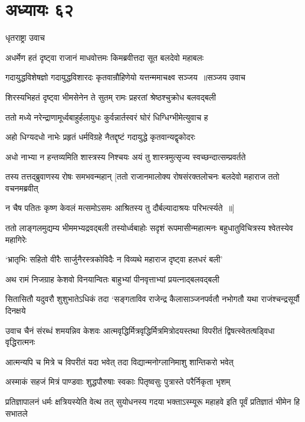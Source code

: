 \chapter{अध्यायः ६२}
\twolineshloka
{धृतराष्ट्रा उवाच}
{}


\twolineshloka
{अधर्मेण हतं दृष्ट्वा राजानं माधवोत्तमः}
{किमब्रवीत्तदा सूत बलदेवो महाबलः}


\threelineshloka
{गदायुद्धविशेषज्ञो गदायुद्धविशारदः}
{कृतवान्रौहिणेयो यत्तन्ममाचक्ष्व सञ्जय ॥सञ्जय उवाच}
{}


\twolineshloka
{शिरस्यभिहतं दृष्ट्वा भीमसेनेन ते सुतम्}
{रामः प्रहरतां श्रेष्ठश्चुक्रोध बलवद्बली}


\twolineshloka
{ततो मध्ये नरेन्द्राणामूर्ध्वबाहुर्हलायुधः}
{कुर्वन्नार्तस्वरं घोरं धिग्धिग्भीमेत्युवाच ह}


\twolineshloka
{अहो धिग्यदधो नाभेः प्रहृतं धर्मविग्रहे}
{नैतद्दृष्टं गदायुद्धे कृतवान्यद्वृकोदरः}


\twolineshloka
{अधो नाभ्या न हन्तव्यमिति शास्त्रस्य निश्चयः}
{अयं तु शास्त्रमुत्सृज्य स्वच्छन्दात्सम्प्रवर्तते}


\threelineshloka
{तस्य तत्तद्ब्रुवाणस्य रोषः समभवन्महान्}
{[ततो राजानमालोक्य रोषसंरक्तलोचनः}
{बलदेवो महाराज ततो वचनमब्रवीत्}


\twolineshloka
{न चैष पतितः कृष्ण केवलं मत्समोऽसमः}
{आश्रितस्य तु दौर्बल्यादाश्रयः परिभर्त्स्यते ॥]}


ततो लाङ्गलमुद्यम्य भीममभ्यद्रवद्बली
\twolineshloka
{तस्योर्ध्वबाहोः सदृशं रूपमासीन्महात्मनः}
{बहुधातुविचित्रस्य श्वेतस्येव महागिरेः}


\twolineshloka
{`भ्रातृभिः सहितो वीरैः सार्जुनैरस्त्रकोविदैः}
{न विव्यथे महाराज दृष्ट्वा हलधरं बली'}


\twolineshloka
{अथ रामं निजग्राह केशवो विनयान्वितः}
{बाहुभ्यां पीनवृत्ताभ्यां प्रयत्नाद्बलवद्बली}


\threelineshloka
{सितासितौ यदुवरौ शुशुभातेऽधिकं तदा}
{`सङ्गताविव राजेन्द्र कैलासाञ्जनपर्वतौ}
{नभोगतौ यथा राजंश्चन्द्रसूर्यौ दिनक्षये}


उवाच चैनं संरब्धं शमयन्निव केशवः
\twolineshloka
{आत्मवृद्धिर्मित्रवृद्धिर्मित्रमित्रोदयस्तथा}
{विपरीतं द्विषत्स्वेतत्षड्विधा वृद्धिरात्मनः}


\twolineshloka
{आत्मन्यपि च मित्रे च विपरीतं यदा भवेत्}
{तदा विद्यान्मनोग्लानिमाशु शान्तिकरो भवेत्}


\twolineshloka
{अस्माकं सहजं मित्रं पाण्डवाः शुद्धपौरुषाः}
{स्वकाः पितृष्वसुः पुत्रास्ते परैर्निकृता भृशम्}


प्रतिज्ञापालनं धर्मः क्षत्रियस्येति वेत्थ तत्
\twolineshloka
{सुयोधनस्य गदया भक्ताऽस्म्यूरू महाहवे}
{इति पूर्वं प्रतिज्ञातं भीमेन हि सभातले}


